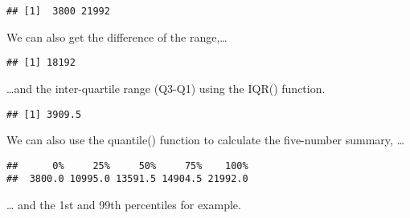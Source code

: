 \documentclass[]{article}
\newenvironment{Shaded}{\begin{snugshade}}{\end{snugshade}}
\newcommand{\DataTypeTok}[1]{\textcolor[rgb]{0.13,0.29,0.53}{#1}}
\newcommand{\FloatTok}[1]{\textcolor[rgb]{0.00,0.00,0.81}{#1}}
\newcommand{\KeywordTok}[1]{\textcolor[rgb]{0.13,0.29,0.53}{\textbf{#1}}}
\newcommand{\NormalTok}[1]{#1}
\newcommand{\OperatorTok}[1]{\textcolor[rgb]{0.81,0.36,0.00}{\textbf{#1}}}
\newcommand{\StringTok}[1]{\textcolor[rgb]{0.31,0.60,0.02}{#1}}
\begin{document}
\begin{verbatim}
## [1]  3800 21992
\end{verbatim}

We can also get the difference of the range,\ldots{}

\begin{Shaded}
\end{Shaded}

\begin{verbatim}
## [1] 18192
\end{verbatim}

\ldots and the inter-quartile range (Q3-Q1) using the {IQR()} function.

\begin{Shaded}
\end{Shaded}

\begin{verbatim}
## [1] 3909.5
\end{verbatim}

We can also use the {quantile()} function to calculate the five-number
summary, \ldots{}

\begin{Shaded}
\end{Shaded}

\begin{verbatim}
##      0%     25%     50%     75%    100% 
##  3800.0 10995.0 13591.5 14904.5 21992.0
\end{verbatim}

\ldots{} and the 1st and 99th percentiles for example.

\begin{Shaded}
\end{Shaded}
\end{document}
